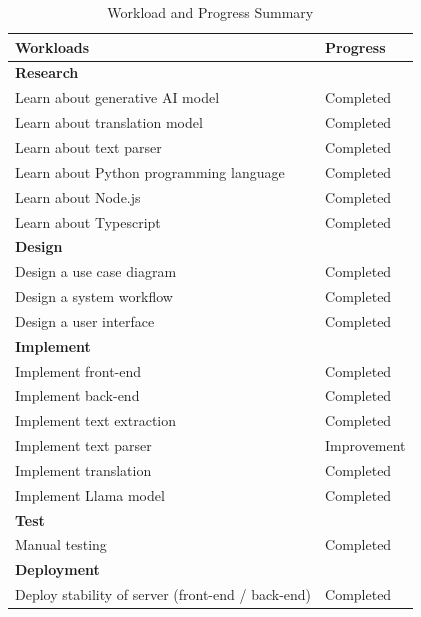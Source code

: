 \documentclass[12pt,oneside,openright,a4paper]{cpe-english-project}
\begin{document}
\begin{table}[H]
  \centering
  \caption{Workload and Progress Summary}
  \label{tbl:workload-and-progress-summary}
  \begin{tabular}{|p{8cm}|p{4cm}|}
    \hline
    \textbf{Workloads}    & \textbf{Progress} \\
    \hline
    \textbf{Research}                                   &                   \\
    Learn about generative AI model           & Completed         \\
    Learn about translation model            & Completed         \\
    Learn about text parser            & Completed         \\
    Learn about Python programming language             & Completed         \\
    Learn about Node.js                                 & Completed         \\
    Learn about Typescript                              & Completed         \\
    \hline
    \textbf{Design}                                     &                   \\
    Design a use case diagram                           & Completed         \\
    Design a system workflow                            & Completed         \\
    Design a user interface                             & Completed         \\
    \hline
    \textbf{Implement}                                  &                   \\
    Implement front-end                                 & Completed         \\
    Implement back-end                                  & Completed         \\
    Implement text extraction                                  & Completed        \\
    Implement text parser                                  & Improvement        \\
    Implement translation                                  & Completed         \\
    Implement Llama model                                  & Completed         \\
    \hline
    \textbf{Test}                                       &                   \\
    Manual testing                                        & Completed         \\
    \hline
    \textbf{Deployment}                                   &                   \\
    Deploy stability of server (front-end / back-end) & Completed       \\
    \hline
  \end{tabular}
\end{table}
\end{document}
